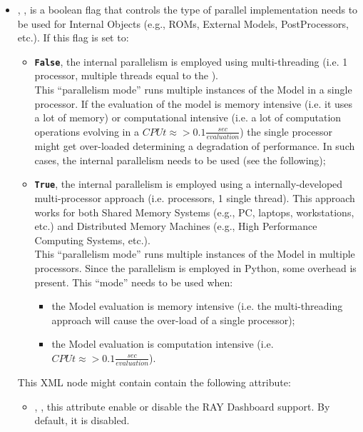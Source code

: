 \begin{itemize}
\item {}, , is a boolean
flag that controls the type of parallel implementation needs to be used for Internal
Objects (e.g., ROMs, External Models, PostProcessors, etc.).
If this flag is set to:
\begin{itemize}
 \item  \textbf{\texttt{False}}, the internal parallelism is employed using multi-threading
 (i.e. 1 processor, multiple threads equal to the ).
 \\\nb This ``parallelism mode'' runs multiple instances of the Model in a single processor.
 If the evaluation of the model is memory intensive (i.e. it uses a lot of memory) or computational
 intensive (i.e. a lot of computation operations evolving in a $CPUt  \approx >  0.1\frac{sec}{evaluation}$)
 the single processor might get over-loaded determining a degradation of performance. In such cases, the internal
 parallelism needs to be used (see the following);
 \item  \textbf{\texttt{True}}, the internal parallelism is employed using a internally-developed multi-processor
 approach (i.e.  processors, 1 single thread). This approach works for both Shared Memory Systems
 (e.g., PC, laptops, workstations, etc.) and Distributed Memory Machines (e.g., High Performance Computing Systems, etc.).
 \\\nb This ``parallelism mode'' runs multiple instances of the Model in multiple processors. Since the parallelism is employed
 in Python, some overhead is present. This ``mode'' needs to be used when:
 \begin{itemize}
  \item the Model evaluation is memory intensive (i.e. the multi-threading approach will cause the over-load of a single processor);
  \item the Model evaluation is computation intensive (i.e. $CPUt  \approx >  0.1\frac{sec}{evaluation}$).
 \end{itemize}
\end{itemize}
%
  This XML node might contain contain the following attribute:
  \vspace{-5mm}
  \begin{itemize}
    \itemsep0em
    \item {}, , this
    attribute enable or disable the RAY Dashboard support. By default,
    it is disabled.
  \end{itemize}
%


\end{itemize}
